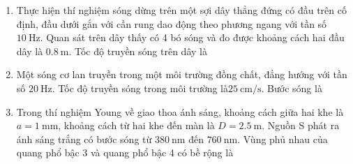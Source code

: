\begin{enumerate}[label=\bfseries Câu \arabic*:]
\item Thực hiện thí nghiệm sóng dừng trên một sợi dây thẳng đứng có đầu trên cố định, đầu dưới gắn với cần rung dao động theo phương ngang với tần số $\SI{10}{\hertz}$. Quan sát trên dây thấy có 4 bó sóng và đo được khoảng cách hai đầu dây là $\SI{0.8}{\meter}$. Tốc độ truyền sóng trên dây là

\item Một sóng cơ lan truyền trong một môi trường đồng chất, đẳng hướng với tần số $\SI{20}{\hertz}$. Tốc độ truyền sóng trong môi trường là$\SI{25}{\centi\meter/\second}$. Bước sóng là

\item Trong thí nghiệm Young về giao thoa ánh sáng, khoảng cách giữa hai khe là $a=\SI{1}{\milli\meter}$, khoảng cách từ hai khe đến màn là $D=\SI{2.5}{\meter}$. Nguồn S phát ra ánh sáng trắng có bước sóng từ $\SI{380}{\nano\meter}$ đến $\SI{760}{\nano\meter}$. Vùng phủ nhau của quang phổ bậc 3 và quang phổ bậc 4 có bề rộng là


\end{enumerate}
